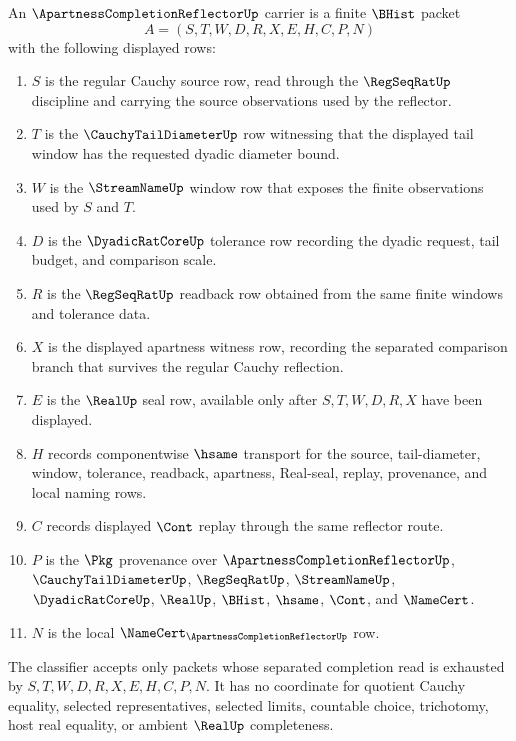 \begin{definition}
\label{def:apartness-completion-reflector-carrier}
An $\ApartnessCompletionReflectorUp$ carrier is a finite $\BHist$ packet
$$
A=(S,T,W,D,R,X,E,H,C,P,N)
$$
with the following displayed rows:
\begin{enumerate}
\item $S$ is the regular Cauchy source row, read through the $\RegSeqRatUp$ discipline and carrying the source observations used by the reflector.
\item $T$ is the $\CauchyTailDiameterUp$ row witnessing that the displayed tail window has the requested dyadic diameter bound.
\item $W$ is the $\StreamNameUp$ window row that exposes the finite observations used by $S$ and $T$.
\item $D$ is the $\DyadicRatCoreUp$ tolerance row recording the dyadic request, tail budget, and comparison scale.
\item $R$ is the $\RegSeqRatUp$ readback row obtained from the same finite windows and tolerance data.
\item $X$ is the displayed apartness witness row, recording the separated comparison branch that survives the regular Cauchy reflection.
\item $E$ is the $\RealUp$ seal row, available only after $S,T,W,D,R,X$ have been displayed.
\item $H$ records componentwise $\hsame$ transport for the source, tail-diameter, window, tolerance, readback, apartness, Real-seal, replay, provenance, and local naming rows.
\item $C$ records displayed $\Cont$ replay through the same reflector route.
\item $P$ is the $\Pkg$ provenance over $\ApartnessCompletionReflectorUp$, $\CauchyTailDiameterUp$, $\RegSeqRatUp$, $\StreamNameUp$, $\DyadicRatCoreUp$, $\RealUp$, $\BHist$, $\hsame$, $\Cont$, and $\NameCert$.
\item $N$ is the local $\NameCert_{\ApartnessCompletionReflectorUp}$ row.
\end{enumerate}
The classifier accepts only packets whose separated completion read is exhausted by $S,T,W,D,R,X,E,H,C,P,N$. It has no coordinate for quotient Cauchy equality, selected representatives, selected limits, countable choice, trichotomy, host real equality, or ambient $\RealUp$ completeness.
\end{definition}


